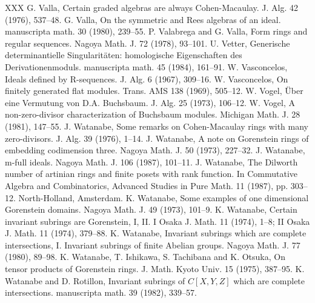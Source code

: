 \begin{thebibliography}{XXX}
 G. Valla, Certain graded algebras are always Cohen-Macaulay. J. Alg. 42 (1976), 537--48.
 G. Valla, On the symmetric and Rees algebras of an ideal. manuscripta math. 30 (1980), 239--55.
 P. Valabrega and G. Valla, Form rings and regular sequences. Nagoya Math. J. 72 (1978), 93--101.
 U. Vetter, Generische determinantielle Singularit\"aten: homologische Eigenschaften des Derivationenmoduls. manuscripta math. 45 (1984), 161--91.
 W. Vasconcelos, Ideals defined by R-sequences. J. Alg. 6 (1967), 309--16.
 W. Vasconcelos, On finitely generated flat modules. Trans. AMS 138 (1969), 505--12.
 W. Vogel, \"Uber eine Vermutung von D.A. Buchsbaum. J. Alg. 25 (1973), 106--12.
 W. Vogel, A non-zero-divisor characterization of Buchsbaum modules. Michigan Math. J. 28 (1981), 147--55.
 J. Watanabe, Some remarks on Cohen-Macaulay rings with many zero-divisors. J. Alg. 39 (1976), 1--14.
 J. Watanabe, A note on Gorenstein rings of embedding codimension three. Nagoya Math. J. 50 (1973), 227--32.
 J. Watanabe, m-full ideals. Nagoya Math. J. 106 (1987), 101--11.
 J. Watanabe, The Dilworth number of artinian rings and finite posets with rank function. In Commutative Algebra and Combinatorics, Advanced Studies in Pure Math. 11 (1987), pp. 303--12. North-Holland, Amsterdam.
 K. Watanabe, Some examples of one dimensional Gorenstein domains. Nagoya Math. J. 49 (1973), 101--9.
 K. Watanabe, Certain invariant subrings are Gorenstein, I, II. I Osaka J. Math. 11 (1974), 1--8; II Osaka J. Math. 11 (1974), 379--88.
 K. Watanabe, Invariant subrings which are complete intersections, I. Invariant subrings of finite Abelian groups. Nagoya Math. J. 77 (1980), 89--98.
 K. Watanabe, T. Ishikawa, S. Tachibana and K. Otsuka, On tensor products of Gorenstein rings. J. Math. Kyoto Univ. 15 (1975), 387--95.
 K. Watanabe and D. Rotillon, Invariant subrings of $C[X,Y,Z]$ which are complete intersections. manuscripta math. 39 (1982), 339--57.
\end{thebibliography}
